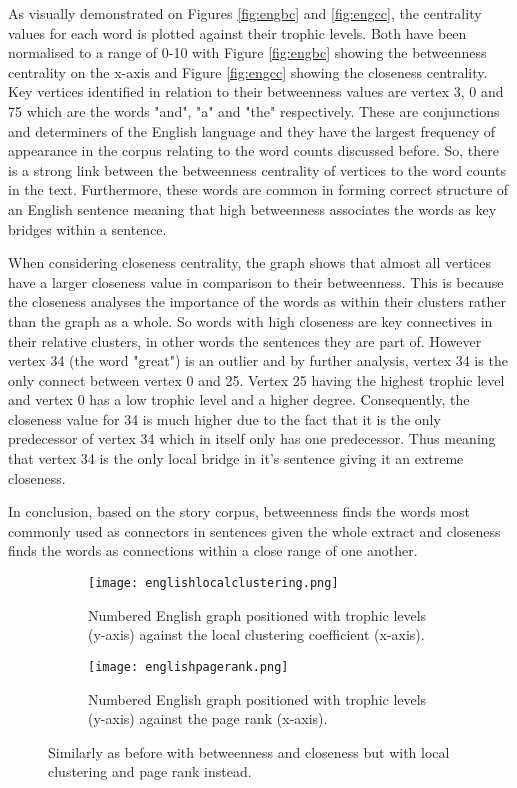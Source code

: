 As visually demonstrated on Figures \ref{fig:engbc} and \ref{fig:engcc}, the centrality values for each word is plotted against their trophic levels. Both have been normalised to a range of 0-10 with Figure \ref{fig:engbc} showing the betweenness centrality on the x-axis and Figure \ref{fig:engcc} showing the closeness centrality. Key vertices identified in relation to their betweenness values are vertex 3, 0 and 75 which are the words "and", "a" and "the" respectively. These are conjunctions and determiners of the English language and they have the largest frequency of appearance in the corpus relating to the word counts discussed before. So, there is a strong link between the betweenness centrality of vertices to the word counts in the text. Furthermore, these words are common in forming correct structure of an English sentence meaning that high betweenness associates the words as key bridges within a sentence. 

When considering closeness centrality, the graph shows that almost all vertices have a larger closeness value in comparison to their betweenness. This is because the closeness analyses the importance of the words as within their clusters rather than the graph as a whole. So words with high closeness are key connectives in their relative clusters, in other words the sentences they are part of. However vertex 34 (the word "great") is an outlier and by further analysis, vertex 34 is the only connect between vertex 0 and 25. Vertex 25 having the highest trophic level and vertex 0 has a low trophic level and a higher degree. Consequently, the closeness value for 34 is much higher due to the fact that it is the only predecessor of vertex 34 which in itself only has one predecessor. Thus meaning that vertex 34 is the only local bridge in it's sentence giving it an extreme closeness.

In conclusion, based on the story corpus, betweenness finds the words most commonly used as connectors in sentences given the whole extract and closeness finds the words as connections within a close range of one another.

\begin{figure}[H]
\centering
\begin{subfigure}{.45\textwidth}
	\hspace{-1cm} 
	\texttt{[image: englishlocalclustering.png]}
	\caption{Numbered English graph positioned with trophic levels (y-axis) against the local clustering coefficient (x-axis).}
	\label{fig:englc}
\end{subfigure}
\hfill
\begin{subfigure}{.45\textwidth}
	\hspace{-1cm} 
	\texttt{[image: englishpagerank.png]}
	\caption{Numbered English graph positioned with trophic levels (y-axis) against the page rank (x-axis).}
	\label{fig:engpr}
\end{subfigure}
\caption{Similarly as before with betweenness and closeness but with local clustering and page rank instead.}
\end{figure}

